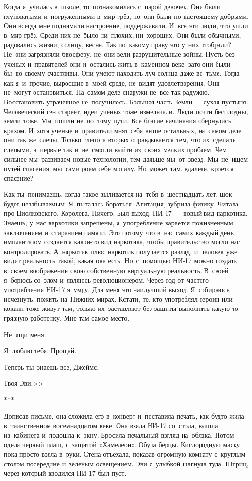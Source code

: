 {Когда я~училась в~школе, то~познакомилась с~парой девочек.
Они были глуповатыми и~погруженными в~мир грёз, но~они были по-настоящему добрыми.
Они всегда мне поднимали настроение, поддерживали.
И~все эти люди, что ушли в~мир грёз.
Среди них не~было ни~плохих, ни~хороших.
Они были обычными, радовались жизни, солнцу, весне.
Так по~какому праву это у~них отобрали? Не~они загрязняли биосферу, не~они вели разрушительные войны.
Пусть без ученых и~правителей они и~остались жить в~каменном веке, зато они были бы~по-своему счастливы.
Они умеют находить луч солнца даже во~тьме.
Тогда как я~и~прочие, выросшие в~моей среде, не~видят удовлетворения.
Они не~могут остановиться.
На~самом деле снаружи не~все так радужно.
Восстановить утраченное не~получилось.
Большая часть Земли --- сухая пустыня.
Человеческий ген стареет, идеи ученых тоже измельчали.
Люди почти бесплодны, земли тоже.
Мы~пошли не~по~тому пути.
Все благие начинания обернулись крахом.
И~хотя ученые и~правители мнят себя выше остальных, на~самом деле они так же~слепы.
Только слепота вторых оправдывается тем, что их~сделали слепыми, а~первые так и~не~смогли выйти из~своих мелких проблем.
Чем сильнее мы~развиваем новые технологии, тем дальше мы~от~звезд.
Мы~не~ищем путей спасения, мы~сами роем себе могилу.
Но~может там, вдалеке, кроется спасение?

Как ты~понимаешь, когда такое выливается на~тебя в~шестнадцать лет, шок будет незабываемым.
Я~пыталась бороться.
Агитация, зубрила физику.
Читала про Циолковского, Королева.
Ничего.
Был выход.
НИ-17 --- новый вид наркотика.
Знаешь, у~нас наркотики запрещены, а~употребление карается пожизненным заключением и~стиранием памяти.
Это потому что в~нас самих каждый день имплантатом создается какой-то вид наркотика, чтобы правительство могло нас контролировать.
А~наркотик плюс наркотик получается разлад, и~человек уже видит реальность такой, какая она есть.
Но~с~помощью НИ-17 можно создать в~своем воображении свою собственную виртуальную реальность.
В~своей я~борюсь со~злом и~являюсь революционером.
Через год от~частого употребления НИ-17 я~умру.
Для меня это наилучший выход.
Я~собираюсь исчезнуть, пожить на~Нижних мирах.
Кстати, те, кто употреблял героин или кокаин тоже живут там, только их~заставляют без защиты выполнять какую-то грязную работенку.
Мне там самое место.

Не~ищи меня.

Я~люблю тебя. Прощай.

Теперь ты~знаешь все, Джеймс.

\begin{flushright}
Твоя Эви.>>
\end{flushright}
}
\begin{center}
	***
\end{center}
 
Дописав письмо, она сложила его в~конверт и~поставила печать, как будто жила в~таинственном восемнадцатом веке.
Она взяла НИ-17 со~стола, вышла из~кабинета и~подошла к~окну.
Бросила печальный взгляд на~облака.
Потом одела черный плащ, с~защитой «Хамелеон».
Обула берцы.
Кислородную маску пока просто взяла в~руки.
Стена отъехала, показав огромную комнату с~круглым столом посередине и~зеленым освещением.
Эви с~улыбкой шагнула туда.
Шприц, через который вводился НИ-17 был пуст.

